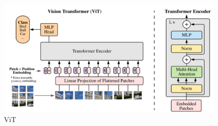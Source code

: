 \begin{figure}[h!t]
    \centering
    \includegraphics[width=1\linewidth]{vit.png}
    \caption{ViT}
    \label{fig:enter-label}
\end{figure}